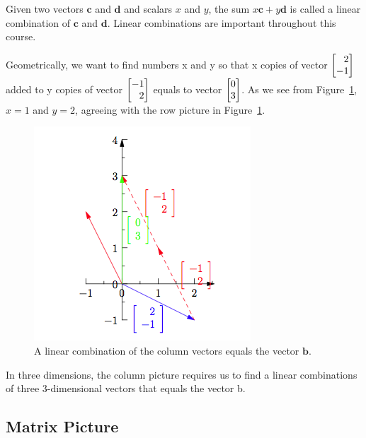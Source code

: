 \documentclass{ximera}
\begin{document}
Given two vectors $\mathbf{c}$ and $\mathbf{d}$ and scalars $x$ and
$y$, the sum $x\mathbf{c} + y\mathbf{d}$ is called a linear
combination of $\mathbf{c}$ and $\mathbf{d}$. Linear combinations are
important throughout this course.


Geometrically, we want to find numbers x and y so that x copies of
vector $\begin{bmatrix}\phantom{-}2\\-1\end{bmatrix}$ added to y copies of vector
$\begin{bmatrix}-1\\\phantom{-}2\end{bmatrix}$ equals to vector
$\begin{bmatrix}0\\3\end{bmatrix}$. As we see from Figure~\ref{fig:rowpict}, $x =
1$ and $y = 2$, agreeing with the row picture in
Figure~\ref{fig:rowpict}.

\begin{figure}[H]\label{fig:rowpict}
\begin{image}
\includegraphics{Geometry2.png}
\end{image}
\caption{A linear combination of the column vectors equals the vector
  $\mathbf{b}$.}
\end{figure}


\noindent
In three dimensions, the column picture requires us to find a linear combinations of three 3-dimensional vectors that equals the vector b.

\subsection*{Matrix Picture}
\end{document}
